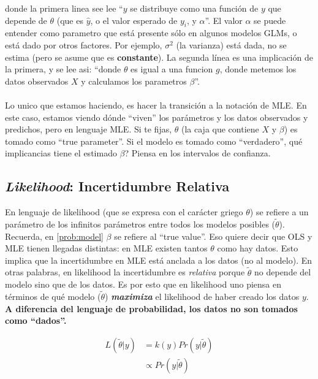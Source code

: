 \documentclass[10pt]{article}
\begin{document}
donde la primera linea see lee ``$y$ se distribuye como una funci\'on de $y$ que depende de $\theta$ (que es $\hat{y}$, o el valor esperado de $y_{i}$, y $\alpha$''. El valor $\alpha$ se puede entender como parametro que est\'a presente s\'olo en algunos modelos GLMs, o est\'a dado por otros factores. Por ejemplo, $\sigma^{2}$ (la varianza) est\'a dada, no se estima (pero se asume que es {\bf constante}). La segunda l\'inea es una implicaci\'on de la primera, y se lee asi: ``donde $\theta$ es igual a una funcion $g$, donde metemos los datos observados $X$ y calculamos los parametros $\beta$''.

\paragraph{} Lo unico que estamos haciendo, es hacer la transici\'on a la notaci\'on de MLE. En este caso, estamos viendo d\'onde ``viven'' los par\'ametros y los datos observados y predichos, pero en lenguaje MLE. Si te fijas, $\theta$ (la caja que contiene $X$ y $\beta$) es tomado como ``true parameter''. {\color{red}Si el modelo es tomado como ``verdadero'', qu\'e implicancias tiene el estimado $\beta$? Piensa en los intervalos de confianza}.

\subsection*{\emph{Likelihood}: Incertidumbre Relativa}

En lenguaje de likelihood (que se expresa con el car\'acter griego $\theta$) se refiere a un par\'ametro de los infinitos par\'ametros entre todos los modelos posibles ($\tilde{\theta}$). Recuerda, en \autoref{prob:model} $\beta$ se refiere al ``true value''. Eso quiere decir que OLS y MLE tienen llegadas distintas: en MLE existen tantos $\theta$ como hay datos. Esto implica que la incertidumbre en MLE est\'a anclada a los datos (no al modelo). En otras palabras, en likelihood la incertidumbre es \emph{relativa} porque $\tilde{\theta}$ no depende del modelo sino que de los datos. Es por esto que en likelihood uno piensa en t\'erminos de qu\'e modelo ($\tilde{\theta}$) \emph{{\bf maximiza}} el likelihood de haber creado los datos $y$. {\bf A diferencia del lenguaje de probabilidad, los datos no son tomados como ``dados''.}


 


\begin{equation} \label{lik:model}
\begin{split}
L(\tilde{\theta}|y) & =  k(y)Pr(y|\tilde{\theta})\\
& \propto Pr(y|\tilde{\theta})
\end{split}
\end{equation}
\end{document}
